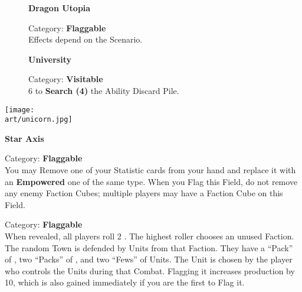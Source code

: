 \begin{figure}[H]
  \begin{minipage}[t]{0.47\textwidth}
    \vspace{0pt}
    \centering
    \textbf{Dragon Utopia}\par
    \caption{\small Category: \textbf{Flaggable}\\Effects depend on the Scenario.}
  \end{minipage}\hfill
  \begin{minipage}[t]{0.47\textwidth}
    \vspace{0pt}
    \centering
    \textbf{University}\par
    \caption{\small Category: \textbf{Visitable}\\
       6  to \textbf{Search (4)} the Ability Discard Pile.}
  \end{minipage}
\end{figure}

\begin{multicols*}{2}

{\centering\phantom{Star Axis}\par}
\texttt{[image: \\art/unicorn.jpg]}

\columnbreak

{\centering\textbf{Star Axis}\par}
{\small Category: \textbf{Flaggable}\\
  You may Remove one of your Statistic cards from your hand and replace it with an \textbf{Empowered} one of the same type.
  When you Flag this Field, do not remove any enemy Faction Cubes; multiple players may have a Faction Cube on this Field.
}

\bigskip

{\centering\textbf{}\par}
{\small Category: \textbf{Flaggable}\\
  When revealed, all players roll 2 .
  The highest roller chooses an unused Faction.
  The random Town is defended by Units from that Faction.
  They have a ``Pack'' of , two ``Packs'' of , and two ``Fews'' of  Units.
  The  Unit is chosen by the player who controls the Units during that Combat.
  Flagging it increases  production by 10, which is also gained immediately if you are the first to Flag it.
}

\end{multicols*}
